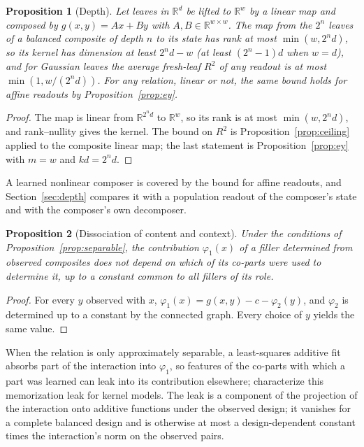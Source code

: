 \documentclass[10pt]{article}
\theoremstyle{plain}
\newtheorem{proposition}{Proposition}
\theoremstyle{remark}
\newcommand{\R}{\mathbb{R}}
\begin{document}
\begin{proposition}[Depth]
\label{prop:depth}
Let leaves in $\R^d$ be lifted to $\R^w$ by a linear map and composed by $g(x, y) = Ax + By$ with $A, B \in \R^{w \times w}$. The map from the $2^n$ leaves of a balanced composite of depth $n$ to its state has rank at most $\min(w, 2^n d)$, so its kernel has dimension at least $2^n d - w$ (at least $(2^n - 1)d$ when $w = d$), and for Gaussian leaves the average fresh-leaf $R^2$ of any readout is at most $\min(1, w/(2^n d))$. For any relation, linear or not, the same bound holds for affine readouts by Proposition~\ref{prop:ey}.
\end{proposition}

\begin{proof}
The map is linear from $\R^{2^n d}$ to $\R^w$, so its rank is at most $\min(w, 2^n d)$, and rank--nullity gives the kernel. The bound on $R^2$ is Proposition~\ref{prop:ceiling} applied to the composite linear map; the last statement is Proposition~\ref{prop:ey} with $m = w$ and $kd = 2^n d$.
\end{proof}

\noindent
A learned nonlinear composer is covered by the bound for affine readouts, and Section~\ref{sec:depth} compares it with a population readout of the composer's state and with the composer's own decomposer.

\begin{proposition}[Dissociation of content and context]
\label{prop:context}
Under the conditions of Proposition~\ref{prop:separable}, the contribution $\varphi_1(x)$ of a filler determined from observed composites does not depend on which of its co-parts were used to determine it, up to a constant common to all fillers of its role.
\end{proposition}

\begin{proof}
For every $y$ observed with $x$, $\varphi_1(x) = g(x, y) - c - \varphi_2(y)$, and $\varphi_2$ is determined up to a constant by the connected graph. Every choice of $y$ yields the same value.
\end{proof}

\noindent
When the relation is only approximately separable, a least-squares additive fit absorbs part of the interaction into $\varphi_1$, so features of the co-parts with which a part was learned can leak into its contribution elsewhere; \citet{lippl2025} characterize this memorization leak for kernel models. The leak is a component of the projection of the interaction onto additive functions under the observed design; it vanishes for a complete balanced design and is otherwise at most a design-dependent constant times the interaction's norm on the observed pairs.
\end{document}
